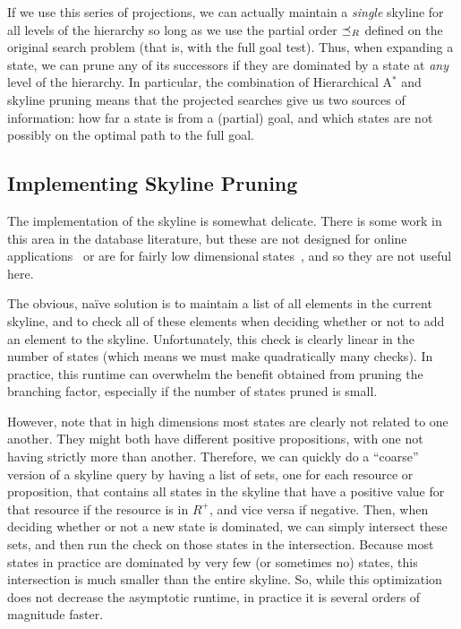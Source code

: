 \documentclass[letterpaper]{article}
\theoremstyle{plain} \newtheorem{theorem}{Theorem} \newtheorem{proposition}{Proposition} \newtheorem{lemma}{Lemma}
\theoremstyle{definition} \newtheorem{definition}{Definition} \newtheorem{conjecture}{Conjecture} \newtheorem*{example}{Example}
\theoremstyle{remark} \newtheorem*{remark}{Remark} \newtheorem*{note}{Note} \newtheorem{case}{Case}
\newcommand{\Astar}{A$^*$ }
\begin{document}
If we use this series of projections, we can actually maintain a
\textit{single} skyline for all levels of the hierarchy so long as
we use the partial order $\preceq_R$ defined on the original search problem
(that is, with the full goal test). Thus, when expanding a 
state, we can prune any of its successors if they are dominated
by a state at \textit{any} level of the hierarchy.  In particular,
the combination of Hierarchical \Astar and skyline pruning means
that the projected searches give us two sources of information: how
far a state is from a (partial) goal, and which states are not
possibly on the optimal path to the full goal. 

\subsection{Implementing Skyline Pruning}

The implementation of the skyline is somewhat delicate.  There
is some work in this area in the database literature, but these are
not designed for online applications~\citep{skylineoperator,tan01efficient}
or are for fairly low dimensional states~\citep{KossmannRR02}, and
so they are not useful here.

The obvious, na\"ive solution is to maintain a list of all elements
in the current skyline, and to check all of these elements when
deciding whether or not to add an element to the skyline. Unfortunately,
this check is clearly linear in the number of states (which means
we must make quadratically many checks). In practice, this
runtime can overwhelm the benefit obtained from pruning the branching factor,
especially if the number of states pruned is small.


However, note that in high dimensions most states are clearly not
related to one another.  They might both have different positive
propositions, with one not having strictly more than another.
Therefore, we can quickly do a ``coarse'' version of a skyline query
by having a list of sets, one for each resource or proposition,
that contains all states in the skyline that have a positive value
for that resource if the resource is in $R^+$, and
vice versa if negative. Then, when deciding whether or not a new
state is dominated, we can simply intersect these sets, and then
run the check on those states in the intersection. Because most
states in practice are dominated by very few (or sometimes no)
states, this intersection is much smaller than the entire skyline.
So, while this optimization does not decrease the asymptotic runtime,
in practice it is several orders of magnitude faster.
\end{document}
